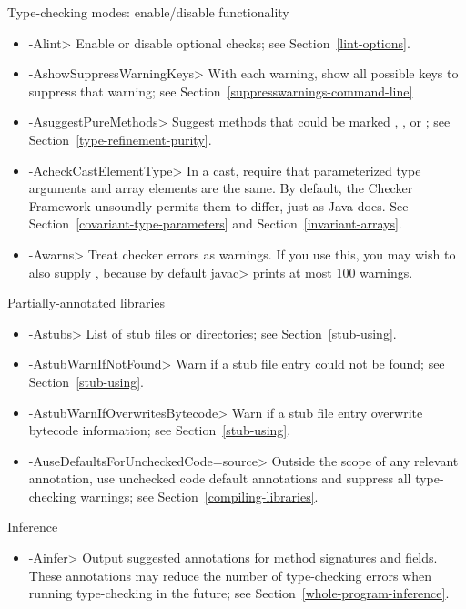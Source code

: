 Type-checking modes:  enable/disable functionality
\begin{itemize}
\item \<-Alint>
  Enable or disable optional checks; see Section~\ref{lint-options}.
\item \<-AshowSuppressWarningKeys>
  With each warning, show all possible keys to suppress that warning;
  see Section~\ref{suppresswarnings-command-line}
\item \<-AsuggestPureMethods>
  Suggest methods that could be marked
  ,
  ,
  or ; see
  Section~\ref{type-refinement-purity}.
\item \<-AcheckCastElementType>
  In a cast, require that parameterized type arguments and array elements
  are the same.  By default, the Checker Framework unsoundly permits them
  to differ, just as Java does.  See Section~\ref{covariant-type-parameters}
  and Section~\ref{invariant-arrays}.
\item \<-Awarns>
  Treat checker errors as warnings.  If you use this, you
  may wish to also supply , because by default
  \<javac> prints at most 100 warnings.
\end{itemize}

Partially-annotated libraries
\begin{itemize}
\item \<-Astubs>
  List of stub files or directories; see Section~\ref{stub-using}.
\item \<-AstubWarnIfNotFound>
  Warn if a stub file entry could not be found; see Section~\ref{stub-using}.
\item \<-AstubWarnIfOverwritesBytecode>
  Warn if a stub file entry overwrite bytecode information; see
  Section~\ref{stub-using}.
\item \<-AuseDefaultsForUncheckedCode=source>
  Outside the scope of any relevant
   annotation, use unchecked code
  default annotations and suppress all type-checking warnings; see
  Section~\ref{compiling-libraries}.
\end{itemize}

Inference
\begin{itemize}
\item \<-Ainfer>
  Output suggested annotations for method signatures and fields.
  These annotations may reduce the number of type-checking
  errors when running type-checking in the future; see
  Section~\ref{whole-program-inference}.

\end{itemize}

